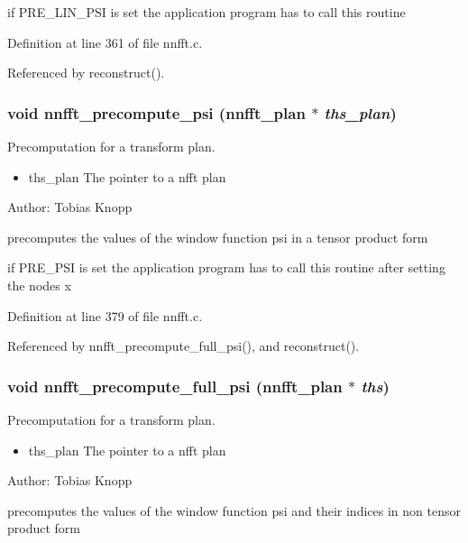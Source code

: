 if PRE\_\-LIN\_\-PSI is set the application program has to call this routine 

Definition at line 361 of file nnfft.c.

Referenced by reconstruct().\hypertarget{group__nnfft_g962d6f449cbad4faf81e20328a911c46}{
\subsubsection{\setlength{\rightskip}{0pt plus 5cm}void nnfft\_\-precompute\_\-psi ({\bf nnfft\_\-plan} $\ast$ {\em ths\_\-plan})}}
\label{group__nnfft_g962d6f449cbad4faf81e20328a911c46}


Precomputation for a transform plan. 

\begin{itemize}
\item ths\_\-plan The pointer to a nfft plan\end{itemize}
\begin{Desc}
\item[Author:]Tobias Knopp\end{Desc}
precomputes the values of the window function psi in a tensor product form

if PRE\_\-PSI is set the application program has to call this routine after setting the nodes x 

Definition at line 379 of file nnfft.c.

Referenced by nnfft\_\-precompute\_\-full\_\-psi(), and reconstruct().\hypertarget{group__nnfft_g78cf7bac65f6de46182ea1ff509c2af9}{
\subsubsection{\setlength{\rightskip}{0pt plus 5cm}void nnfft\_\-precompute\_\-full\_\-psi ({\bf nnfft\_\-plan} $\ast$ {\em ths})}}
\label{group__nnfft_g78cf7bac65f6de46182ea1ff509c2af9}


Precomputation for a transform plan. 

\begin{itemize}
\item ths\_\-plan The pointer to a nfft plan\end{itemize}
\begin{Desc}
\item[Author:]Tobias Knopp\end{Desc}
precomputes the values of the window function psi and their indices in non tensor product form

